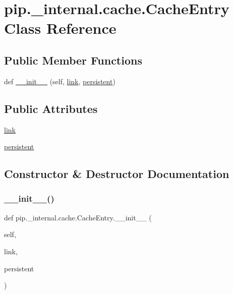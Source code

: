 \hypertarget{classpip_1_1__internal_1_1cache_1_1CacheEntry}{}\section{pip.\+\_\+internal.\+cache.\+Cache\+Entry Class Reference}
\label{classpip_1_1__internal_1_1cache_1_1CacheEntry}
\subsection*{Public Member Functions}
\begin{DoxyCompactItemize}
\item 
def \hyperlink{classpip_1_1__internal_1_1cache_1_1CacheEntry_a8a3a8ccf285901b3fd60ee5f7abebcae}{\+\_\+\+\_\+init\+\_\+\+\_\+} (self, \hyperlink{classpip_1_1__internal_1_1cache_1_1CacheEntry_a59c5112873ae36d04bb92ccf89fe4dff}{link}, \hyperlink{classpip_1_1__internal_1_1cache_1_1CacheEntry_ad8e9a41d0838efc8dcd6df99915a5a04}{persistent})
\end{DoxyCompactItemize}
\subsection*{Public Attributes}
\begin{DoxyCompactItemize}
\item 
\hyperlink{classpip_1_1__internal_1_1cache_1_1CacheEntry_a59c5112873ae36d04bb92ccf89fe4dff}{link}
\item 
\hyperlink{classpip_1_1__internal_1_1cache_1_1CacheEntry_ad8e9a41d0838efc8dcd6df99915a5a04}{persistent}
\end{DoxyCompactItemize}


\subsection{Constructor \& Destructor Documentation}
\mbox{\label{classpip_1_1__internal_1_1cache_1_1CacheEntry_a8a3a8ccf285901b3fd60ee5f7abebcae}} 
\subsubsection{\texorpdfstring{\+\_\+\+\_\+init\+\_\+\+\_\+()}{\_\_init\_\_()}}
{\footnotesize\ttfamily def pip.\+\_\+internal.\+cache.\+Cache\+Entry.\+\_\+\+\_\+init\+\_\+\+\_\+ (\begin{DoxyParamCaption}\item[{}]{self,  }\item[{}]{link,  }\item[{}]{persistent }\end{DoxyParamCaption})}



